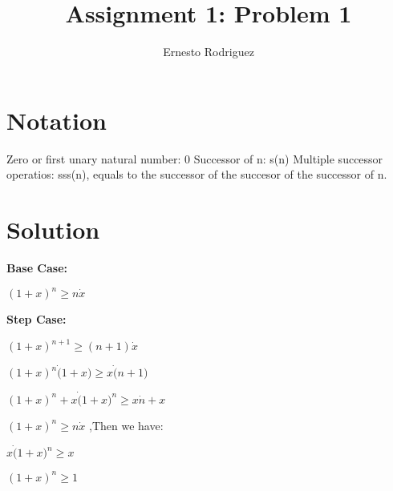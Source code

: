 \documentclass{article}
\title{Assignment 1: Problem 1}
\author{Ernesto Rodriguez}
\begin{document}
\maketitle

\section{Notation}

Zero or first unary natural number: 0
Successor of n: s(n)
Multiple successor operatios: sss(n), equals to the successor of the succesor of the successor of n.

\section{Solution}

{\bf Base Case:}

$(1+x)^n \ge n \dot x$

{\bf Step Case:}

$(1+x)^{n+1} \ge (n+1) \dot x$ 

$(1+x)^n \dot (1+x) \ge x \dot (n+1) $ 

$(1+x)^n + x \dot (1+x)^n \ge x \dot n + x $ 

$ (1+x)^n \ge n \dot x $ ,Then we have:

$x \dot (1+x)^n \ge x $

$ (1+x)^n \ge 1 $
\end{document}
